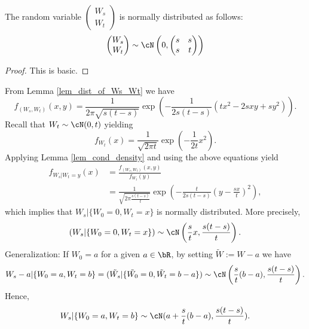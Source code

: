 \begin{lem}\label{lem_dist_of_Ws_Wt}
	The random variable 
	$\begin{pmatrix}
		W_s \\
		W_t
	\end{pmatrix}$
	 is normally distributed as follows:
	\begin{equation*}
	\begin{pmatrix}
		W_s \\ 
		W_t
	\end{pmatrix}
	\sim \cN\left(0,\begin{pmatrix} s & s \\
	s & t
	\end{pmatrix}\right)
	\end{equation*}
\end{lem}
\begin{proof}
	This is basic.
\end{proof}
From Lemma \ref{lem_dist_of_Ws_Wt} we have
\begin{equation}
	f_{(W_s,W_t)}(x,y) = \frac{1}{2\pi \sqrt{s(t-s)}}\exp \left( -\frac{1}{2s(t-s)} (tx^2 - 2s x y + s y^2)\right).
\end{equation}		
Recall that $W_t \sim \cN(0,t)$ yielding
\begin{equation}
	f_{W_t}(x) = \frac{1}{\sqrt{2\pi t}} \exp\left( -\frac{1}{2 t} x^2\right).
\end{equation}
Applying Lemma \ref{lem_cond_density} and using the above equations yield
\begin{align}
 	f_{W_s|W_t=y}(x) &= \frac{f_{(W_s,W_t)}(x,y)}{f_{W_t}(y)} \\ \nonumber
 	 & = \frac{1}{\sqrt{2\pi \frac{s(t-s)}{t}}} \exp\left( -\frac{t}{2s(t-s)} \left(y-\frac{s x}{t}\right)^2\right),
\end{align}
which implies that $W_s|\{W_0 = 0, W_t = x\}$ is normally distributed. More precisely,
\begin{equation}
	(W_s|\{W_0 = 0, W_t = x\}) \sim \cN \left( \frac{s}{t}x, \frac{s(t-s)}{t}\right).
\end{equation}
Generalization: If $W_0 = a$ for a given $a \in \bR$, by setting $\tilde{W}:= W-a$ we have
\begin{equation}
W_s-a|\{W_0 = a, W_t = b\} = (\tilde{W_s}|\{\tilde{W_0} = 0, \tilde{W_t} = b-a\}) \sim \cN \left( \frac{s}{t}(b-a), \frac{s(t-s)}{t}\right).
\end{equation}
Hence,
\begin{equation}
	W_s|\{W_0 = a, W_t = b\} \sim \cN(a+\frac{s}{t}(b-a), \frac{s(t-s)}{t}).
\end{equation}


